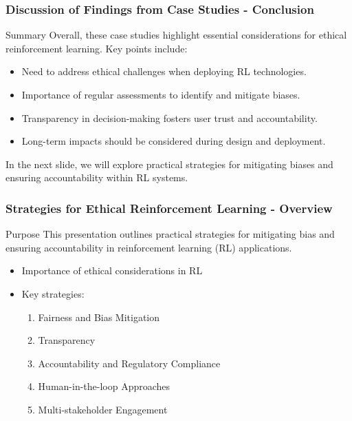 \documentclass{beamer}
\begin{document}
\begin{frame}[fragile]
    \frametitle{Discussion of Findings from Case Studies - Conclusion}
    \begin{block}{Summary}
        Overall, these case studies highlight essential considerations for ethical reinforcement learning. Key points include:
        \begin{itemize}
            \item Need to address ethical challenges when deploying RL technologies.
            \item Importance of regular assessments to identify and mitigate biases.
            \item Transparency in decision-making fosters user trust and accountability.
            \item Long-term impacts should be considered during design and deployment.
        \end{itemize}
        In the next slide, we will explore practical strategies for mitigating biases and ensuring accountability within RL systems.
    \end{block}
\end{frame}

\begin{frame}[fragile]
    \frametitle{Strategies for Ethical Reinforcement Learning - Overview}
    \begin{block}{Purpose}
        This presentation outlines practical strategies for mitigating bias and ensuring accountability in reinforcement learning (RL) applications.
    \end{block}
    
    \begin{itemize}
        \item Importance of ethical considerations in RL
        \item Key strategies:
        \begin{enumerate}
            \item Fairness and Bias Mitigation
            \item Transparency
            \item Accountability and Regulatory Compliance
            \item Human-in-the-loop Approaches
            \item Multi-stakeholder Engagement
        \end{enumerate}
    \end{itemize}
\end{frame}
\end{document}
